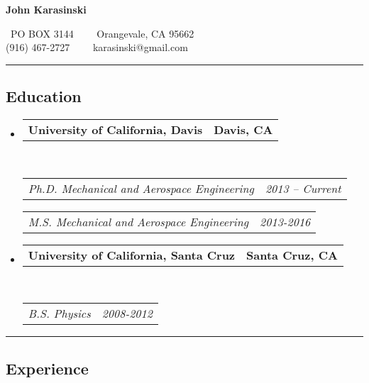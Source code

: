 \documentclass[10pt,letterpaper]{article}
\makeatletter
\newcommand{\headerrow}[2]
{\begin{tabular*}{\linewidth}{l@{\extracolsep{\fill}}r}
	#1 &
	#2 \\
\end{tabular*}}
\makeatother
\begin{document}
\begin{center}
{\LARGE \textbf{John Karasinski}}

\ PO BOX 3144\ \ \textbullet
\ \ Orangevale, CA 95662
\\
(916) 467-2727\ \ \textbullet
\ \ karasinski@gmail.com
\end{center}

\hrule
\vspace{-0.4em}
\subsection*{Education}

\begin{itemize}
	\parskip=0.1em

	\item
	\headerrow
		{\textbf{University of California, Davis}}
		{\textbf{Davis, CA}}
	\\
	\headerrow
		{\emph{Ph.D. Mechanical and Aerospace Engineering}}
		{\emph{2013 -- Current}}

	\headerrow
		{\emph{M.S. Mechanical and Aerospace Engineering}}
		{\emph{2013-2016}}

	\item
	\headerrow
		{\textbf{University of California, Santa Cruz}}
		{\textbf{Santa Cruz, CA}}
	\\
	\headerrow
		{\emph{B.S. Physics}}
		{\emph{2008-2012}}
\end{itemize}

\hrule
\vspace{-0.4em}
\subsection*{Experience}
\end{document}
